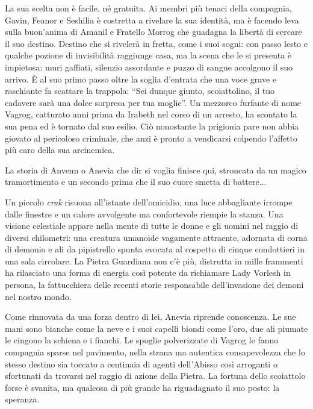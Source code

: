 La sua scelta non \`e facile, n\'e gratuita. Ai membri pi\`u tenaci della compagnia, Gavin, Feanor e Seshilia \`e costretta a rivelare la sua identit\`a, ma \`e facendo leva sulla buon'anima di Amanil e Fratello Morrog che guadagna la  libert\`a di cercare il suo destino. Destino che si riveler\`a in fretta, come i suoi sogni: con passo lesto e qualche pozione di invisibilit\`a raggiunge casa, ma la scena che le si presenta \`e impietosa: muri gaffiati, silenzio assordante e puzzo di sangue accolgono il suo arrivo. \`E al suo primo passo oltre la soglia d'entrata che una voce grave e raschiante fa scattare la trappola: ``Sei dunque giunto, scoiattolino, il tuo cadavere sar\`a una dolce sorpresa per tua moglie''. Un mezzorco furfante di nome Vagrog, catturato anni prima da Irabeth nel corso di un arresto, ha scontato la sua pena ed \`e tornato dal suo esilio. Ci\`o nonostante la prigionia pare non abbia giovato al pericoloso criminale, che anzi \`e pronto a vendicarsi colpendo l'affetto pi\`u caro della sua arcinemica.

La storia di Anvenn o Anevia che dir si voglia finisce qui, stroncata da un magico tramortimento e un secondo prima che il suo cuore smetta di battere... 

Un piccolo \emph{crak} risuona all'istante dell'omicidio, una luce abbagliante irrompe dalle finestre e un calore avvolgente ma confortevole riempie la stanza. Una visione celestiale appare nella mente di tutte le donne e gli uomini nel raggio di diversi chilometri: una creatura umanoide vagamente attraente, adornata di corna di demonio e ali da pipistrello spunta evocata al cospetto di cinque condottieri in una sala circolare. La Pietra Guardiana non c'\`e pi\`u, distrutta in mille frammenti ha rilasciato una forma di energia cos\`i potente da richiamare Lady Vorlesh in persona, la fattucchiera delle recenti storie responsabile dell'invasione dei demoni nel nostro mondo. 

Come rinnovata da una forza dentro di lei, Anevia riprende conoscenza. Le sue mani sono bianche come la neve e i suoi capelli biondi come l'oro, due ali piumate le cingono la schiena e i fianchi. Le spoglie polverizzate di Vagrog le fanno compagnia sparse nel pavimento, nella strana ma autentica consapevolezza che lo stesso destino sia toccato a centinaia di agenti dell'Abisso cos\`i arroganti o sfortunati da trovarsi nel raggio di azione della Pietra. La fortuna dello scoiattolo forse \`e svanita, ma qualcosa di pi\`u grande ha riguadagnato il suo posto: la speranza.

